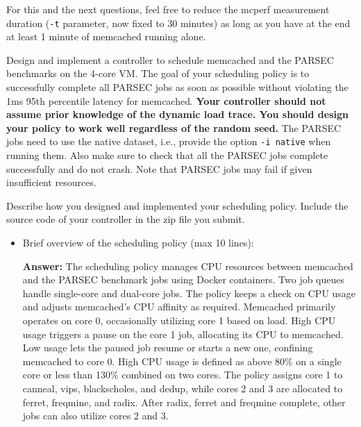 \begin{enumerate}
    For this and the next questions, feel free to reduce the mcperf measurement duration (\texttt{-t} parameter, now fixed to 30 minutes) as long as you have at the end at least 1 minute of memcached running alone.
    
    Design and implement a controller to schedule memcached and the PARSEC benchmarks on the 4-core VM. The goal of your scheduling policy is to successfully complete all PARSEC jobs as soon as possible without violating the 1ms 95th percentile latency for memcached. \textbf{Your controller should not assume prior knowledge of the dynamic load trace. You should design your policy to work well regardless of the random seed.} The PARSEC jobs need to use the native dataset, i.e., provide the option \texttt{-i native} when running them. Also make sure to check that all the PARSEC jobs complete successfully and do not crash. Note that PARSEC jobs may fail if given insufficient resources.
    
    Describe how you designed and implemented your scheduling policy. Include the source code of your controller in the zip file you submit. 

    \begin{itemize}
        \item Brief overview of the scheduling policy (max 10 lines):
        
    \textbf{Answer:} The scheduling policy manages CPU resources between memcached and the PARSEC benchmark jobs using Docker containers. Two job queues handle single-core and dual-core jobs. The policy keeps a check on CPU usage and adjusts memcached's CPU affinity as required. Memcached primarily operates on core 0, occasionally utilizing core 1 based on load. High CPU usage triggers a pause on the core 1 job, allocating its CPU to memcached. Low usage lets the paused job resume or starts a new one, confining memcached to core 0. High CPU usage is defined as above 80\% on a single core or less than 130\% combined on two cores. The policy assigns core 1 to canneal, vips, blackscholes, and dedup, while cores 2 and 3 are allocated to ferret, freqmine, and radix. After radix, ferret and freqmine complete, other jobs can also utilize cores 2 and 3.



\end{itemize}
\end{enumerate}
